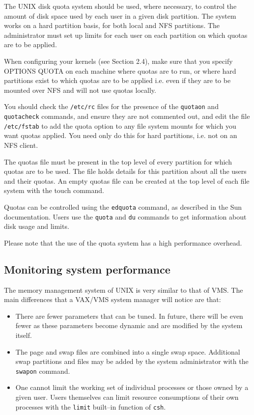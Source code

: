 The UNIX disk quota system should be used, where necessary, to control the
amount of disk space used by each user in a given disk partition. The system 
works on a hard partition basis, for both local and NFS partitions. The
administrator must set up limits for each user on each partition on which
quotas are to be applied.

When configuring your kernels (see Section 2.4), make sure that you specify 
OPTIONS QUOTA on each machine where quotas are to run, or where hard partitions
exist to which quotas are to be applied i.e. even if they are to be mounted
over NFS and will not use quotas locally.

You should check the {\tt /etc/rc} files for the presence of the {\tt quotaon} and
{\tt quotacheck} commands, and ensure they are not commented out, and
edit the file {\tt /etc/fstab} to add the quota option to any file system mounts
for which you want quotas applied. You need  only do this for hard partitions,
i.e. not on an NFS client.

The quotas file must be present in the top level of every partition for which
quotas are to be used. The file holds details for this partition about all the
users and their quotas. An empty quotas file can be created at the top level 
of each file system with the touch command.

Quotas can be controlled using the {\tt edquota} command, as described in the Sun
documentation. Users use the {\tt quota} and {\tt du} commands to get information
about disk usage and limits.

Please note that the use of the quota system has a high performance overhead.

\subsection{Monitoring system performance} 

The memory management system of UNIX is very similar to that of VMS. The main
differences that a VAX/VMS system manager will notice are that:

\begin{itemize}

\item There are fewer parameters that can be tuned. In future, there will be
even fewer as these parameters become dynamic and are modified by the system
itself.

\item The page and swap files are combined into a single swap space. Additional
swap partitions and files may be added by the system administrator with the 
{\tt swapon} command.

\item One cannot limit the working set of individual processes or those owned
by a given user. Users themselves can limit resource consumptions of their
own processes with the {\tt limit} built--in function of {\tt csh}.

\end {itemize}

